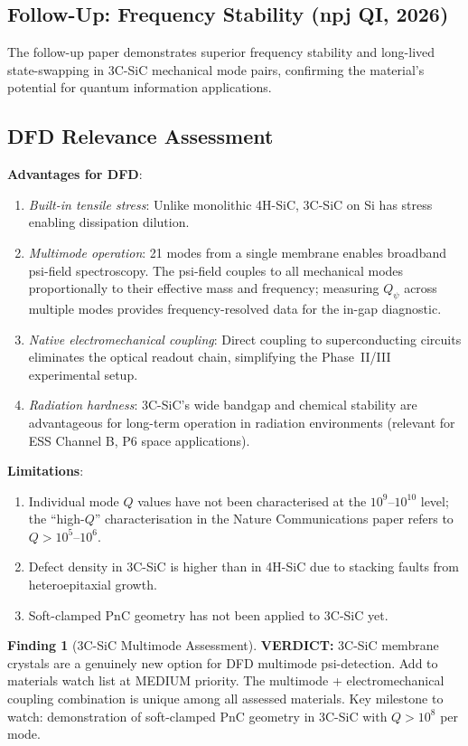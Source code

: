 \documentclass[11pt]{article}
\theoremstyle{definition}
\newtheorem{finding}[theorem]{Finding}
\theoremstyle{remark}
\newcommand{\Qpsi}{Q_\psi}
\newcommand{\verdict}[1]{\textcolor{green!50!black}{\textbf{VERDICT:} #1}}
\begin{document}
\subsection{Follow-Up: Frequency Stability (npj QI, 2026)}

The follow-up paper demonstrates superior frequency stability and
long-lived state-swapping in 3C-SiC mechanical mode pairs, confirming
the material's potential for quantum information applications.

\subsection{DFD Relevance Assessment}

\textbf{Advantages for DFD}:
\begin{enumerate}[nosep]
\item \textit{Built-in tensile stress}: Unlike monolithic 4H-SiC,
  3C-SiC on Si has stress enabling dissipation dilution.
\item \textit{Multimode operation}: 21 modes from a single membrane
  enables broadband psi-field spectroscopy. The psi-field couples to
  all mechanical modes proportionally to their effective mass and
  frequency; measuring $\Qpsi$ across multiple modes provides
  frequency-resolved data for the in-gap diagnostic.
\item \textit{Native electromechanical coupling}: Direct coupling to
  superconducting circuits eliminates the optical readout chain,
  simplifying the Phase~II/III experimental setup.
\item \textit{Radiation hardness}: 3C-SiC's wide bandgap and chemical
  stability are advantageous for long-term operation in radiation
  environments (relevant for ESS Channel B, P6 space applications).
\end{enumerate}

\textbf{Limitations}:
\begin{enumerate}[nosep]
\item Individual mode $Q$ values have not been characterised at the
  $10^9$--$10^{10}$ level; the ``high-$Q$'' characterisation in
  the Nature Communications paper refers to $Q > 10^5$--$10^6$.
\item Defect density in 3C-SiC is higher than in 4H-SiC due to
  stacking faults from heteroepitaxial growth.
\item Soft-clamped PnC geometry has not been applied to 3C-SiC yet.
\end{enumerate}

\begin{finding}[3C-SiC Multimode Assessment]
\label{find:3c_sic}
\verdict{3C-SiC membrane crystals are a genuinely new option for
DFD multimode psi-detection. Add to materials watch list at MEDIUM
priority. The multimode + electromechanical coupling combination is
unique among all assessed materials. Key milestone to watch:
demonstration of soft-clamped PnC geometry in 3C-SiC with $Q > 10^8$
per mode.}
\end{finding}
\end{document}
